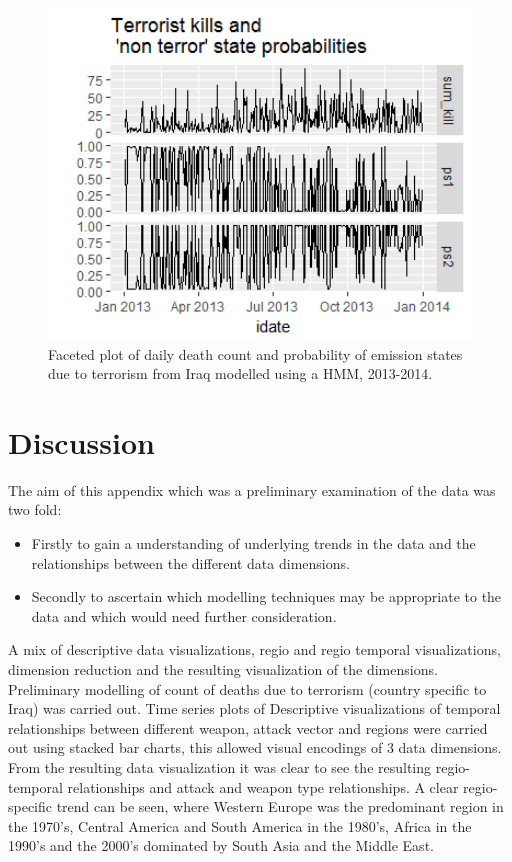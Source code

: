 \begin{figure}[t]
\includegraphics[width=15cm]{Peters_experiment_markdown_files/figure-latex/Rplot02_2013_2014.png}
\caption{Faceted plot of daily death count and probability of emission states due to terrorism from Iraq modelled using a HMM, 2013-2014.}
\label{fig:Rplot02_2013_2014_HMM}
\centering
\end{figure}

\section{Discussion}

The aim of this appendix which was a preliminary examination of the data was two fold:
\begin{itemize}
\item Firstly to gain a understanding of underlying trends in the data and the relationships between the different data dimensions.
\item Secondly to ascertain which modelling techniques may be appropriate to the data and which would need further consideration.
\end{itemize}
A mix of descriptive data visualizations, regio and regio temporal visualizations, dimension reduction and the resulting visualization of the dimensions. Preliminary modelling of count of deaths due to terrorism (country specific to Iraq) was carried out.
Time series plots of Descriptive visualizations of temporal relationships between different weapon, attack vector and regions were carried out using stacked bar charts, this allowed visual encodings  of 3 data dimensions. From the resulting data visualization it was clear to see the resulting regio-temporal relationships and  attack and weapon type relationships. A clear regio-specific trend can be seen, where Western Europe was the predominant region in the 1970's, Central America and South America in the 1980's, Africa in the 1990's and the 2000's dominated by South Asia and the Middle East. 

